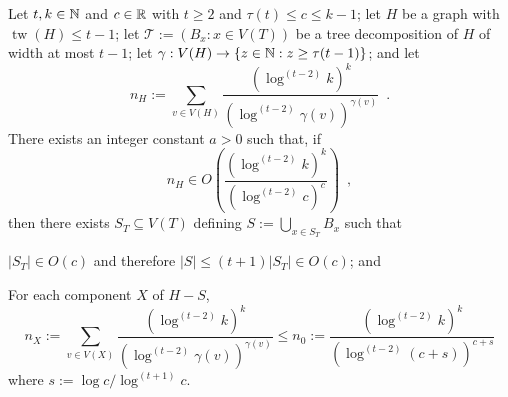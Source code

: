 \documentclass[kpfonts]{patmorin}
\DeclareMathOperator{\tw}{tw}
\theoremstyle{named}
\begin{document}
\begin{lem}\label{t-tree-no-slack-separator}
    Let $t,k\in\mathbb{N}$ and $c\in\mathbb{R}$ with $t\ge 2$ and $\tau(t)\le c\le k-1$; let $H$ be a graph with $\tw(H)\le t-1$; let $\mathcal{T}:=(B_x:x\in V(T))$ be a tree decomposition of $H$ of width at most $t-1$;
    let $\gamma:V(H)\to\{z\in\mathbb{N}: z\ge \tau(t-1)\}$; and let
    \[
        n_H:=\sum_{v\in V(H)} \frac{\left(\log^{(t-2)} k\right)^k}{\left(\log^{(t-2)} \gamma(v)\right)^{\gamma(v)}} \enspace .
    \]
    There exists an integer constant $a>0$ such that,
    if
    \begin{equation}
         n_H \in O\left( \frac{(\log^{(t-2)} k)^k}{(\log^{(t-2)} c)^{c}} \right)\enspace ,
     \label{total-weight-ii}
    \end{equation}
    then there exists $S_T\subseteq V(T)$ defining $S:=\bigcup_{x\in S_T} B_x$ such that
    \begin{compactenum}
        \item $|S_T|\in O(c)$ and therefore $|S|\le (t+1)|S_T|\in O(c)$; and
        \item For each component $X$ of $H-S$,
        \[
            n_X:=\sum_{v\in V(X)} \frac{\left(\log^{(t-2)} k\right)^k}{\left(\log^{(t-2)} \gamma(v)\right)^{\gamma(v)}}
            \le n_0 :=
            \frac{\left(\log^{(t-2)} k\right)^k}{\left(\log^{(t-2)} (c+s)\right)^{c+s}}
        \]
        where $s:=\log c/\log^{(t+1)} c$.
    \end{compactenum}
\end{lem}
\end{document}
